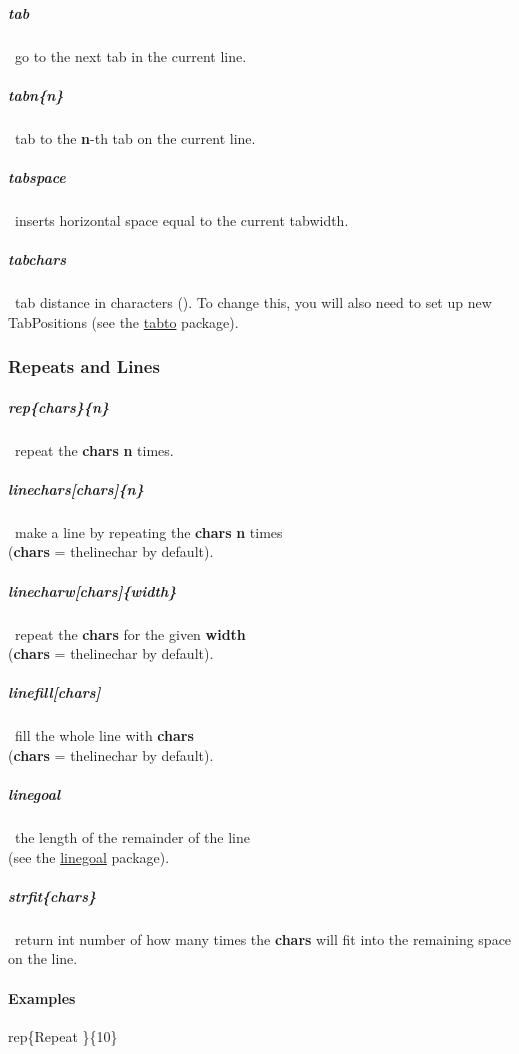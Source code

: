 \documentclass[english,12pt,openany,letterpaper]{book}
\begin{document}
\subparagraph{\bs tab} \dash\ go to the next tab in the current line.

\subparagraph{\bs tabn\{n\}} \dash\ tab to the \textbf{n}-th tab on the current line.

\subparagraph{\bs tabspace} \dash\ inserts horizontal space equal to the current \bs tabwidth.

\subparagraph{\bs tabchars} \dash\ tab distance in characters (\tabchars). To change this, you will also need to set up new \bs TabPositions (see the \href{https://www.ctan.org/pkg/tabto-ltx}{tabto} package).


\break


\subsubsection{Repeats and Lines}

\subparagraph{\bs rep\{chars\}\{n\}} \dash\ repeat the \textbf{chars} \textbf{n} times.

\subparagraph{\bs linechars[chars]\{n\}} \dash\ make a line by repeating the \textbf{chars} \textbf{n} times
\\\tab(\textbf{chars} = \bs thelinechar by default).

\subparagraph{\bs linecharw[chars]\{width\}} \dash\ repeat the \textbf{chars} for the given \textbf{width}
\\\tab(\textbf{chars} = \bs thelinechar by default).

\subparagraph{\bs linefill[chars]} \dash\ fill the whole line with \textbf{chars}
\\\tab(\textbf{chars} = \bs thelinechar by default).

\subparagraph{\bs linegoal} \dash\ the length of the remainder of the line
\\\tab(see the \href{https://www.ctan.org/pkg/linegoal}{linegoal} package).

\subparagraph{\bs strfit\{chars\}} \dash\ return int number of how many times the \textbf{chars} will fit into the remaining space on the line.

\skipline

\paragraph{Examples}

\bs rep\{Repeat \}\{10\}


\skipline
\end{document}
